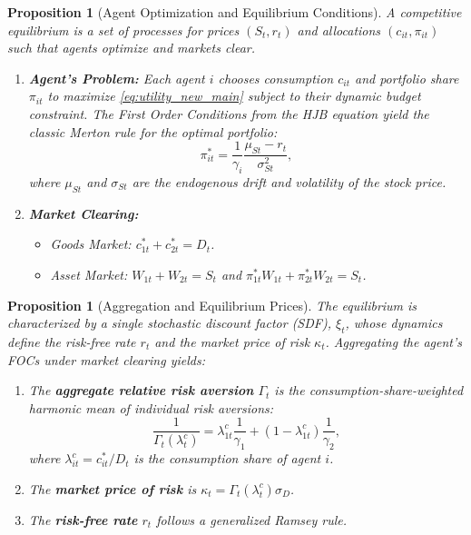 \documentclass[11pt,letterpaper,oneside]{article}
\theoremstyle{plain}
\newtheorem{proposition}[theorem]{Proposition}
\theoremstyle{definition}
\theoremstyle{remark}
\begin{document}
\begin{proposition}[Agent Optimization and Equilibrium Conditions]
A competitive equilibrium is a set of processes for prices \((S_t, r_t)\) and allocations \((c_{it}, \pi_{it})\) such that agents optimize and markets clear.
\begin{enumerate}
    \item \textbf{Agent's Problem:} Each agent \(i\) chooses consumption \(c_{it}\) and portfolio share \(\pi_{it}\) to maximize \eqref{eq:utility_new_main} subject to their dynamic budget constraint. The First Order Conditions from the HJB equation yield the classic Merton rule for the optimal portfolio:
        \begin{equation}\label{eq:merton_rule_new_main}
        \pi_{it}^* = \frac{1}{\gamma_i} \frac{\mu_{St}-r_t}{\sigma_{St}^2},
        \end{equation}
        where \(\mu_{St}\) and \(\sigma_{St}\) are the endogenous drift and volatility of the stock price.
    \item \textbf{Market Clearing:}
        \begin{itemize}
            \item Goods Market: \(c_{1t}^* + c_{2t}^* = D_t\).
            \item Asset Market: \(W_{1t} + W_{2t} = S_t\) and \(\pi_{1t}^* W_{1t} + \pi_{2t}^* W_{2t} = S_t\).
        \end{itemize}
\end{enumerate}
\end{proposition}

\begin{proposition}[Aggregation and Equilibrium Prices]
The equilibrium is characterized by a single stochastic discount factor (SDF), \(\xi_t\), whose dynamics define the risk-free rate \(r_t\) and the market price of risk \(\kappa_t\). Aggregating the agent's FOCs under market clearing yields:
\begin{enumerate}
    \item The \textbf{aggregate relative risk aversion} \(\Gamma_t\) is the consumption-share-weighted harmonic mean of individual risk aversions:
        \begin{equation}\label{eq:gamma_agg_harmonic_new_main}
        \frac{1}{\Gamma_t(\lambda^c_t)} = \lambda^c_{1t}\frac{1}{\gamma_1} + (1-\lambda^c_{1t})\frac{1}{\gamma_2},
        \end{equation}
        where \(\lambda^c_{it} = c_{it}^*/D_t\) is the consumption share of agent \(i\).
    \item The \textbf{market price of risk} is \(\kappa_t = \Gamma_t(\lambda^c_t) \sigma_D\).
    \item The \textbf{risk-free rate} \(r_t\) follows a generalized Ramsey rule.
\end{enumerate}
\end{proposition}
\end{document}
